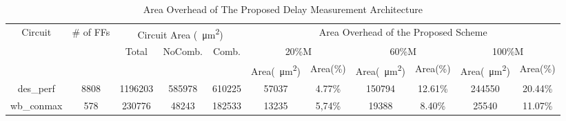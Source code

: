 \begin{table}[]
    \scriptsize
    \caption{Area Overhead of The Proposed Delay Measurement Architecture} \label{tab:area-overhead}
        \begin{tabular}{|c|c|ccc|cccccc|}
            \hline
            \multirow{3}{*}{Circuit} & \multirow{3}{*}{\# of FFs} & \multicolumn{3}{c|}{Circuit Area (\SI{}{\micro\metre^2})}                                                            & \multicolumn{6}{c|}{Area Overhead of the Proposed Scheme}                                                                                                                                                                         \\ \cline{3-11} 
                                     &                            & \multicolumn{1}{c|}{\multirow{2}{*}{Total}} & \multicolumn{1}{c|}{\multirow{2}{*}{NoComb.}} & \multirow{2}{*}{Comb.} & \multicolumn{2}{c|}{20\%M}                                                       & \multicolumn{2}{c|}{60\%M}                                                       & \multicolumn{2}{c|}{100\%M}                                 \\ \cline{6-11} 
                                                              &                            & \multicolumn{1}{c|}{}                       & \multicolumn{1}{c|}{}                         &                        & \multicolumn{1}{c|}{Area(\SI{}{\micro\metre^2})} & \multicolumn{1}{c|}{Area(\%)} & \multicolumn{1}{c|}{Area(\SI{}{\micro\metre^2})} & \multicolumn{1}{c|}{Area(\%)} & \multicolumn{1}{c|}{Area(\SI{}{\micro\metre^2})} & Area(\%) \\ \hline
                                                              des\_perf                & 8808                       & \multicolumn{1}{c|}{1196203}                & \multicolumn{1}{c|}{585978}                   & 610225                 & \multicolumn{1}{c|}{57037}                       & \multicolumn{1}{c|}{4.77\%}   & \multicolumn{1}{c|}{150794}                      & \multicolumn{1}{c|}{12.61\%}  & \multicolumn{1}{c|}{244550}                      & 20.44\%  \\ \hline
                                                              wb\_conmax               & 578                        & \multicolumn{1}{c|}{230776}                 & \multicolumn{1}{c|}{48243}                    & 182533                 & \multicolumn{1}{c|}{13235}                       & \multicolumn{1}{c|}{5,74\%}   & \multicolumn{1}{c|}{19388}                       & \multicolumn{1}{c|}{8.40\%}   & \multicolumn{1}{c|}{25540}                       & 11.07\%  \\ \hline

\end{tabular}
\end{table}

